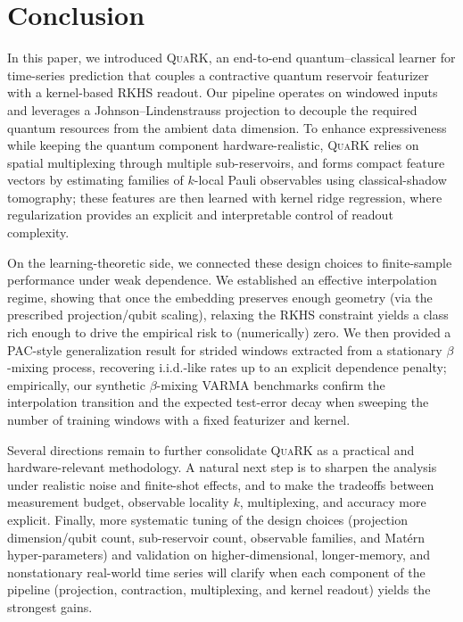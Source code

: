 \section{Conclusion} \label{sec:conslusion}
In this paper, we introduced \textsc{QuaRK}, an end-to-end quantum--classical learner for time-series prediction that couples a contractive quantum reservoir featurizer with a kernel-based RKHS readout. Our pipeline operates on windowed inputs and leverages a Johnson--Lindenstrauss projection to decouple the required quantum resources from the ambient data dimension. To enhance expressiveness while keeping the quantum component hardware-realistic, \textsc{QuaRK} relies on spatial multiplexing through multiple sub-reservoirs, and forms compact feature vectors by estimating families of $k$-local Pauli observables using classical-shadow tomography; these features are then learned with kernel ridge regression, where regularization provides an explicit and interpretable control of readout complexity.

On the learning-theoretic side, we connected these design choices to finite-sample performance under weak dependence. We established an effective interpolation regime, showing that once the embedding preserves enough geometry (via the prescribed projection/qubit scaling), relaxing the RKHS constraint yields a class rich enough to drive the empirical risk to (numerically) zero. We then provided a PAC-style generalization result for strided windows extracted from a stationary $\beta$-mixing process, recovering i.i.d.-like rates up to an explicit dependence penalty; empirically, our synthetic $\beta$-mixing VARMA benchmarks confirm the interpolation transition and the expected test-error decay when sweeping the number of training windows with a fixed featurizer and kernel.

Several directions remain to further consolidate \textsc{QuaRK} as a practical and hardware-relevant methodology. A natural next step is to sharpen the analysis under realistic noise and finite-shot effects, and to make the tradeoffs between measurement budget, observable locality $k$, multiplexing, and accuracy more explicit. Finally, more systematic tuning of the design choices (projection dimension/qubit count, sub-reservoir count, observable families, and Mat\'ern hyper-parameters) and validation on higher-dimensional, longer-memory, and nonstationary real-world time series will clarify when each component of the pipeline (projection, contraction, multiplexing, and kernel readout) yields the strongest gains.
